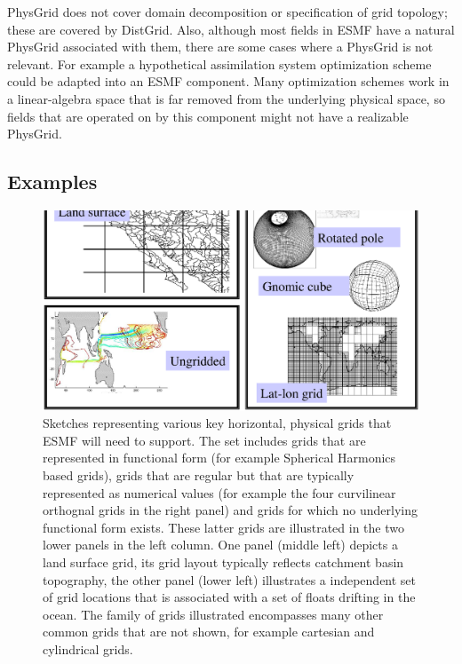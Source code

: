 PhysGrid does not cover domain decomposition or specification of grid
topology; these are covered by DistGrid. Also, although most fields
in ESMF have a natural PhysGrid associated with them, there are
some cases where a PhysGrid is not relevant. For example
a hypothetical assimilation system optimization scheme could be adapted
into an ESMF component. Many optimization schemes work in a linear-algebra
space that is far removed from the underlying physical space, so fields
that are operated on by this component might not have a realizable
PhysGrid.

\subsection{Examples}


\begin{figure}
\includegraphics[trim= 100 200 100 -100,width= 5.5in]{hgridmontage.eps}
\caption{
Sketches representing various key horizontal, physical grids that ESMF will
need to support. The set includes grids that are represented
in functional form (for example Spherical Harmonics based
grids), grids that are regular but that are typically 
represented as numerical values (for example the four
curvilinear orthognal grids in the right panel) and grids for
which no underlying functional form exists. These latter
grids are illustrated in the two lower panels in the left column.
One panel (middle left) depicts a land surface grid, its
grid layout typically reflects catchment basin topography,
the other panel (lower left) illustrates a independent
set of grid locations that is associated with a set of 
floats drifting in the ocean. The family of grids illustrated
encompasses many other common grids that are not shown, for example
cartesian and cylindrical grids.
\label{fig:pg_reqdoc:hgridmontage}
}
\end{figure}

